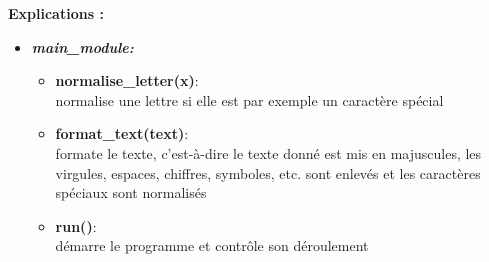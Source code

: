 \documentclass[a4paper,12pt,abstracton,titlepage]{scrartcl}
\begin{document}
{\Large \textbf{Explications :}}
\vspace{0.3cm}
\begin{itemize}
\item \textit{\textbf{main\_module:}}\vspace{0.2cm}
\begin{itemize}
\item \textbf{normalise\_letter(x)}:\\
normalise une lettre si elle est par exemple un caractère spécial\\
\item \textbf{format\_text(text)}:\\
formate le texte, c'est-à-dire le texte donné est mis en majuscules, les virgules, espaces, chiffres, symboles, etc. sont enlevés et les caractères spéciaux sont normalisés\\
\item \textbf{run()}:\\
démarre le programme et contrôle son déroulement\\
\end{itemize}\vspace{0.3cm}


\end{itemize}
\end{document}
